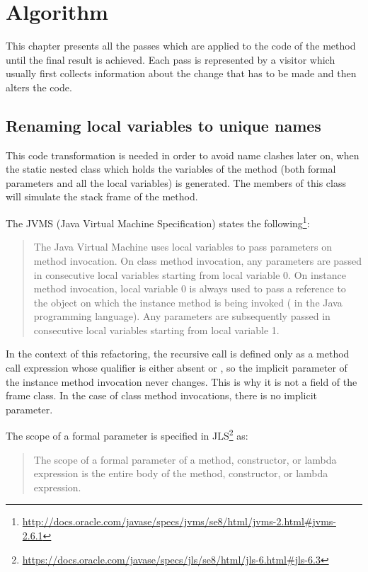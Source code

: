 \chapter{Algorithm}

This chapter presents all the passes which are applied to the code of the method until the final result is achieved.
Each pass is represented by a visitor which usually first collects information about the change that has to be made and
then alters the code.

\section{Renaming local variables to unique names}

This code transformation is needed in order to avoid name clashes later on, when the static nested class which
holds the variables of the method (both formal parameters and all the local variables) is generated. The members of this
class will simulate the stack frame of the method.

The JVMS (Java Virtual Machine Specification) states the
following\footnote{\url{http://docs.oracle.com/javase/specs/jvms/se8/html/jvms-2.html#jvms-2.6.1}}:

\begin{quote}
    The Java Virtual Machine uses local variables to pass parameters on method invocation. On class method invocation,
    any parameters are passed in consecutive local variables starting from local variable 0. On instance method invocation,
    local variable 0 is always used to pass a reference to the object on which the instance method is being invoked
    ( in the Java programming language). Any parameters are subsequently passed in consecutive local
    variables starting from local variable 1.
\end{quote}

In the context of this refactoring, the recursive call is defined only as a method call expression whose qualifier is
either absent or , so the implicit  parameter of the instance method invocation never changes.
This is why it is not a field of the frame class. In the case of class method invocations, there is no implicit
 parameter.

The scope of a formal parameter is specified in JLS\footnote{\url{https://docs.oracle.com/javase/specs/jls/se8/html/jls-6.html#jls-6.3}} as:
\begin{quote}
    The scope of a formal parameter of a method, constructor, or lambda expression is the entire body of the method,
    constructor, or lambda expression.
\end{quote}

